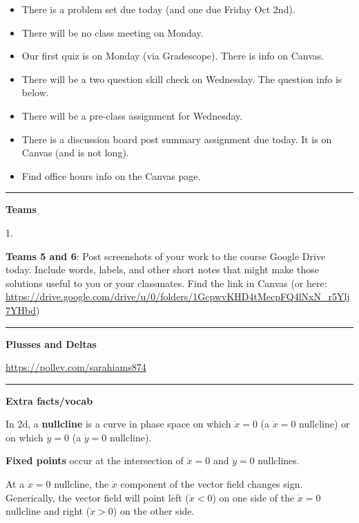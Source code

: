 \documentclass[12pt,letterpaper,noanswers]{exam}
\begin{document}
 \pdfpageheight 11in 
  \pdfpagewidth 8.5in

\noindent 





\begin{itemize}
\itemsep0em
    \item There is a problem set due today (and one due Friday Oct 2nd).
    \item There will be no class meeting on Monday.
    \item Our first quiz is on Monday (via Gradescope).  There is info on Canvas.
    \item There will be a two question skill check on Wednesday.  The question info is below.
    \item There will be a pre-class assignment for Wednesday.
    \item There is a discussion board post summary assignment due today.  It is on Canvas (and is not long).
    \item Find office hours info on the Canvas page.
\end{itemize}

\hrule
\vspace{0.2cm}




\noindent\textbf{Teams}

\begin{multicols}{2}
1. 

\end{multicols}

\noindent \textbf{Teams 5 and 6}: Post screenshots of your work to the course Google Drive today.  Include words, labels, and other short notes that might make those solutions useful to you or your classmates.  Find the link in Canvas (or here: \url{https://drive.google.com/drive/u/0/folders/1GcpwvKHD4tMecpFQ4lNxN_r5Ylj7YHbd})

\vspace{0.2cm}
\hrule
\vspace{0.2cm}

\noindent\textbf{Plusses and Deltas}

\url{https://pollev.com/sarahiams874}

\vspace{0.2cm}
\hrule
\vspace{0.2cm}

\noindent\textbf{Extra facts/vocab}

\begin{tcolorbox}
In 2d, a \textbf{nullcline} is a curve in phase space on which $\dot x = 0$ (a $\dot x = 0$ nullcline) or on which $\dot y=0$ (a $\dot y = 0$ nullcline).

\textbf{Fixed points} occur at the intersection of $\dot x = 0$ and $\dot y = 0$ nullclines.

At a $\dot x = 0$ nullcline, the $\dot x$ component of the vector field changes sign.  Generically, the vector field will point left ($\dot x<0$) on one side of the $\dot x = 0$ nullcline and right ($\dot x > 0$) on the other side.
\end{tcolorbox}
\end{document}
